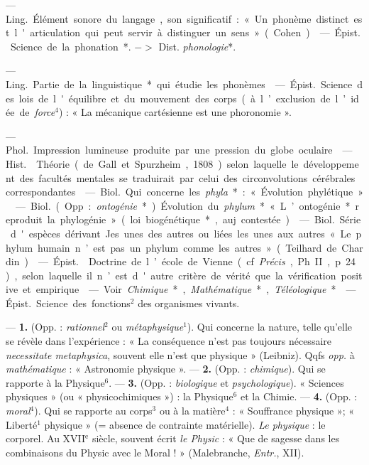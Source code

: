 \begin{itemize}[leftmargin=1cm, label=, itemsep=1pt]
 — \si{Ling.} Élément sonore du langage, son significatif : « Un
phonème distinct est l'articulation qui peut servir à distinguer un sens
» (Cohen).

 — \si{Épist.} Science de la
phonation*. $->$ Dist. {\it phonologie}*.

 — \si{Ling.} Partie de la linguistique* qui étudie les
phonèmes.

 — \si{Épist.} Science des lois de l'équilibre et du mouvement
des corps (à l’exclusion de l’idée de {\it force}$^4$) : « La mécanique
cartésienne est une phoronomie ».

 — \si{Phol.} Impression lumineuse produite par une pression du
globe oculaire.

 — \si{Hist.}  Théorie (de Gall et Spurzheim,
1808) selon laquelle le développement des facultés mentales se traduirait par
celui des circonvolutions cérébrales correspondantes.

 — \si{Biol.} Qui concerne les
{\it phyla}* : « Évolution phylétique ».

 — \si{Biol.} (Opp. : {\it ontogénie}*). Évolution du
{\it phylum}* « L’ontogénie* reproduit la phylogénie » (loi biogénétique*,
auj. contestée).

 — \si{Biol.} Série d'espèces dérivant Jes unes des autres ou
liées les unes aux autres « Le phylum humain n’est pas un phylum comme les
autres » (Teilhard de Chardin).

 — \si{Épist.}  Doctrine de l’école de Vienne
(cf. {\it Précis}, Ph. II, p. 24), selon laquelle il n’est d'autre critère de
vérité que la vérification positive et empirique.

 — Voir {\it Chimique}*, {\it Mathématique}*,
{\it Téléologique}*.

 — \si{Épist.} Science des
fonctions$^2$ des organismes vivants.

 — {\bf 1.} (Opp. : {\it rationnel}$^2$ ou {\it
métaphysique}$^1$). Qui concerne la nature, telle qu’elle se révèle dans
l'expérience : « La conséquence n’est pas toujours nécessaire {\it
necessitate metaphysica}, souvent elle n’est que physique » (Leibniz). Qqfs
{\it opp.} à {\it mathématique} : « Astronomie physique ». — {\bf 2.} (Opp. :
{\it chimique}). Qui se rapporte à la Physique$^6$. — {\bf 3.} (Opp. : {\it
biologique} et {\it psychologique}). « Sciences physiques » (ou «
physicochimiques ») : la Physique$^6$ et la Chimie. — {\bf 4.} (Opp. : {\it
moral}$^4$). Qui se rapporte au corps$^3$ ou à la matière$^4$ : « Souffrance
physique »; « Liberté$^1$ physique » (= absence de contrainte matérielle).
{\it Le physique} : le corporel. Au {\footnotesize XVII}$^\text{e}$ siècle,
souvent écrit {\it le Physic} : « Que de sagesse dans les combinaisons du
 Physic avec le Moral ! » (Malebranche, {\it Entr.}, XII).


\end{itemize}
